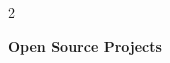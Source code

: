 \documentclass[10pt, letterpaper]{article}
\newenvironment{twocolentry}[2][]{
    \onecolentry
    \def\secondColumn{#2}
    \setcolumnwidth{\fill, 4.5 cm}
    \begin{paracol}{2}
}{
    \switchcolumn \raggedleft \secondColumn
    \end{paracol}
    \endonecolentry
} %
\begin{document}
%
%

\begin{twocolentry}{
    
    }
    \textbf{Open Source Projects}
\end{twocolentry}
\end{document}
